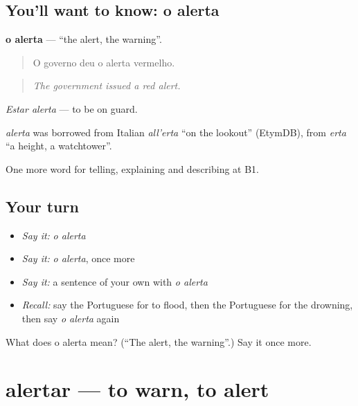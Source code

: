 \subsection*{You'll want to know: o alerta}
\textbf{o alerta} — \textquotedblleft{}the alert, the warning\textquotedblright{}.

\begin{quote}
O governo deu o alerta vermelho.
\end{quote}

\begin{quote}
\emph{The government issued a red alert.}
\end{quote}

\emph{Estar alerta} — to be on guard.

\begin{cousinweb}
\emph{alerta} was borrowed from Italian \emph{all’erta} \textquotedblleft{}on the lookout\textquotedblright{} (EtymDB), from \emph{erta} \textquotedblleft{}a height, a watchtower\textquotedblright{}.
\end{cousinweb}

\begin{grammarlens}[title={What you've built}]
One more word for telling, explaining and describing at B1.
\end{grammarlens}

\subsection*{Your turn}
\begin{itemize}
\raggedright
  \item \emph{Say it:} \emph{o alerta}
  \item \emph{Say it:} \emph{o alerta}, once more
  \item \emph{Say it:} a sentence of your own with \emph{o alerta}
  \item \emph{Recall:} say the Portuguese for to flood, then the Portuguese for the drowning, then say \emph{o alerta} again
\end{itemize}

\begin{tcolorbox}[breakable,colback=teal!4,colframe=teal!35!black,title={Before you move on}]
What does o alerta mean? (\textquotedblleft{}The alert, the warning\textquotedblright{}.) Say it once more.
\end{tcolorbox}
\section[alertar]{alertar — to warn, to alert}

